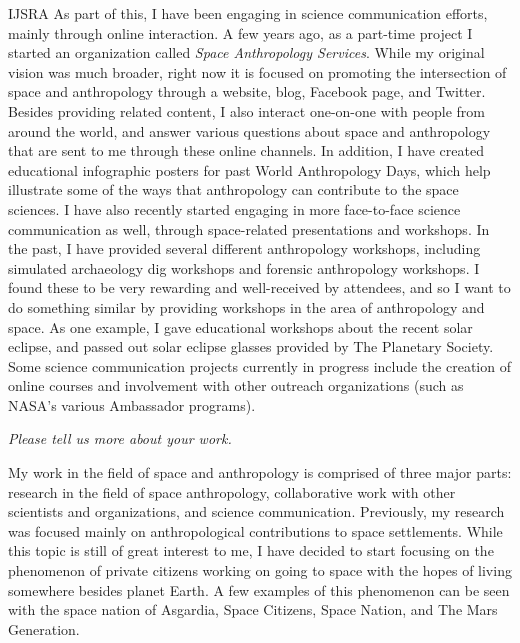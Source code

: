 \begin{labeling}{IJSRA}
	As part of this, I have been engaging in science communication efforts, mainly through online interaction. A few years ago, as a part-time project I started an organization called \emph{Space Anthropology Services}. While my original vision was much broader, right now it is focused on promoting the intersection of space and anthropology through a website, blog, Facebook page, and Twitter. Besides providing related content, I also interact one-on-one with people from around the world, and answer various questions about space and anthropology that are sent to me through these online channels. In addition, I have created educational infographic posters for past World Anthropology Days, which help illustrate some of the ways that anthropology can contribute to the space sciences. I have also recently started engaging in more face-to-face science communication as well, through space-related presentations and workshops. In the past, I have provided several different anthropology workshops, including simulated archaeology dig workshops and forensic anthropology workshops. I found these to be very rewarding and well-received by attendees, and so I want to do something similar by providing workshops in the area of anthropology and space. As one example, I gave educational workshops about the recent solar eclipse, and passed out solar eclipse glasses provided by The Planetary Society. Some science communication projects currently in progress include the creation of online courses and involvement with other outreach organizations (such as NASA’s various Ambassador programs).

	\item[IJSRA] \emph{Please tell us more about your work.}

	\item[KS] My work in the field of space and anthropology is comprised of three major parts: research in the field of space anthropology, collaborative work with other scientists and organizations, and science communication. Previously, my research was focused mainly on anthropological contributions to space settlements. While this topic is still of great interest to me, I have decided to start focusing on the phenomenon of private citizens working on going to space with the hopes of living somewhere besides planet Earth. A few examples of this phenomenon can be seen with the space nation of Asgardia, Space Citizens, Space Nation, and The Mars Generation.


\end{labeling}
